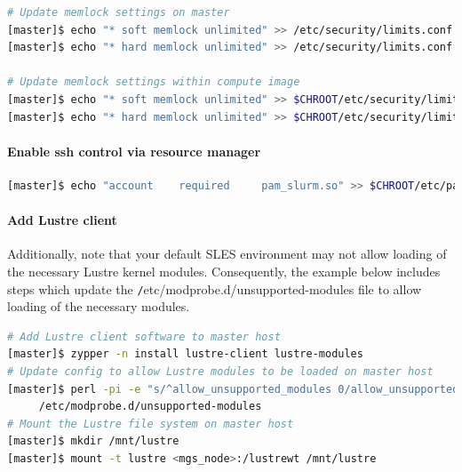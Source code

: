 \documentclass[letterpaper]{article}
\begin{document}
 

\begin{lstlisting}[language=bash,keywords={},upquote=true]
# Update memlock settings on master
[master]$ echo "* soft memlock unlimited" >> /etc/security/limits.conf
[master]$ echo "* hard memlock unlimited" >> /etc/security/limits.conf

# Update memlock settings within compute image
[master]$ echo "* soft memlock unlimited" >> $CHROOT/etc/security/limits.conf
[master]$ echo "* hard memlock unlimited" >> $CHROOT/etc/security/limits.conf
\end{lstlisting}

\paragraph{Enable ssh control via resource manager} 



\begin{lstlisting}[language=bash,keywords={},upquote=true]
[master]$ echo "account    required     pam_slurm.so" >> $CHROOT/etc/pam.d/sshd
\end{lstlisting}

\paragraph{Add Lustre client} 


 Additionally, note that your default SLES environment
  may not allow loading of the necessary Lustre kernel modules. Consequently,
  the example below includes steps which update the {\texttt
    /etc/modprobe.d/unsupported-modules} file to allow loading of the necessary
  modules.

\begin{lstlisting}[language=bash,keywords={},upquote=true]
# Add Lustre client software to master host
[master]$ zypper -n install lustre-client lustre-modules
# Update config to allow Lustre modules to be loaded on master host
[master]$ perl -pi -e "s/^allow_unsupported_modules 0/allow_unsupported_modules 1/" \
     /etc/modprobe.d/unsupported-modules
# Mount the Lustre file system on master host
[master]$ mkdir /mnt/lustre
[master]$ mount -t lustre <mgs_node>:/lustrewt /mnt/lustre
\end{lstlisting}
\end{document}
